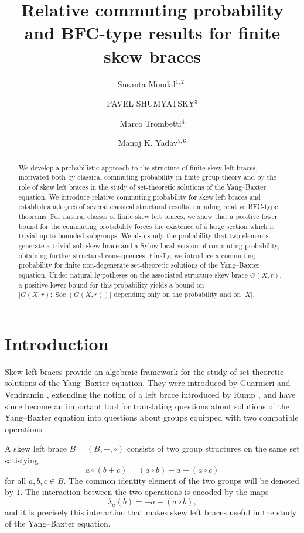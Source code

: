 \documentclass[11pt, oneside]{amsart}
\author{Susanta Mondal$^{1, 2,}$}
\author{PAVEL SHUMYATSKY$^{3}$}
\author{Marco Trombetti$^{4}$}
\author{Manoj K. Yadav$^{5,6}$}
\numberwithin{equation}{section}
\theoremstyle{plain}
\theoremstyle{definition}
\newcommand{\Soc}{\operatorname{Soc} }
\begin{document}
\setcounter{page}{1}
\title[Relative commuting probability and BFC-type results for finite skew  left braces]
{Relative commuting probability and BFC-type results for finite skew braces}





\begin{abstract}

We develop a probabilistic approach to the structure of finite skew left braces, motivated both by classical commuting probability in finite group theory and by the role of skew left braces in the study of set-theoretic solutions of the Yang--Baxter equation. We introduce relative commuting probability for skew left braces and establish analogues of several classical structural results, including relative BFC-type theorems. For natural classes of finite skew left braces, we show that a positive lower bound for the commuting probability forces the existence of a large section which is trivial up to bounded subgroups. We also study the probability that two elements generate a trivial sub-skew brace and a Sylow-local version of commuting probability, obtaining further structural consequences. Finally, we introduce a commuting probability for finite non-degenerate set-theoretic solutions of the Yang--Baxter equation. Under natural hypotheses on the associated structure skew brace $G(X,r)$, a positive lower bound for this probability yields a bound on $|G(X,r):\Soc(G(X,r))|$ depending only on the probability and on $|X|$.

\end{abstract}


\maketitle


\section{Introduction}

Skew left braces provide an algebraic framework for the study of set-theoretic solutions of the Yang--Baxter equation. They were introduced by Guarnieri and Vendramin \cite{GV17}, extending the notion of a left brace introduced by Rump \cite{Rump07}, and have since become an important tool for translating questions about solutions of the Yang--Baxter equation into questions about groups equipped with two compatible operations.

A skew left brace $B=(B,+,\circ)$ consists of two group structures on the same set satisfying
$$
a\circ(b+c)=(a\circ b)-a+(a\circ c)
$$
for all $a,b,c\in B$. The common identity element of the two groups will be denoted by $1$. The interaction between the two operations is encoded by the maps
$$
\lambda_a(b)=-a+(a\circ b),
$$
and it is precisely this interaction that makes skew left braces useful in the study of the Yang--Baxter equation.
\end{document}
